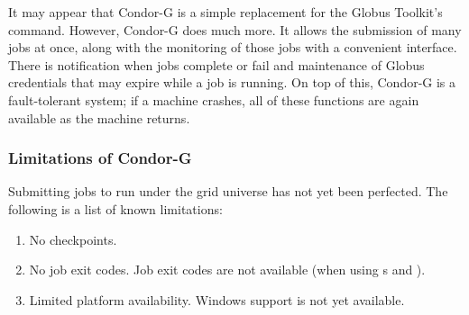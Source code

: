
It may appear that Condor-G is a simple replacement
for the Globus Toolkit's  command.
However, Condor-G does much more.
It allows the submission of many jobs at once,
along with the monitoring of those jobs with a convenient interface.
There is notification when jobs complete or fail
and maintenance of Globus credentials
that may expire while a job is running.
On top of this, Condor-G is a fault-tolerant system;
if a machine crashes,
all of these functions are again available as the machine returns.










\subsubsection{\label{sec:Condor-G-Limits}Limitations of Condor-G}
Submitting jobs to run under the grid universe has not yet
been perfected.
The following is a list of known limitations:

\begin{enumerate}
\item{No checkpoints.}
\item{No job exit codes.}
Job exit codes are not available (when using s
 and ).
\item{Limited platform availability.}
Windows support is not yet available.
\end{enumerate}



